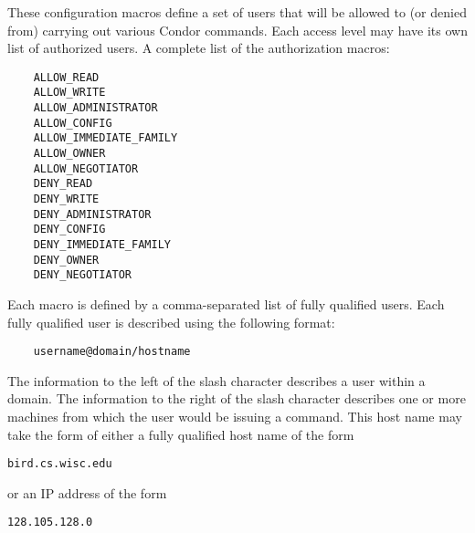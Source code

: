 These configuration macros define a set of users that will be
allowed to (or denied from) carrying out various Condor commands.
Each access level may have its own list of authorized users.
A complete list of the authorization macros:
\begin{verbatim}
    ALLOW_READ
    ALLOW_WRITE
    ALLOW_ADMINISTRATOR
    ALLOW_CONFIG
    ALLOW_IMMEDIATE_FAMILY
    ALLOW_OWNER
    ALLOW_NEGOTIATOR
    DENY_READ
    DENY_WRITE
    DENY_ADMINISTRATOR
    DENY_CONFIG
    DENY_IMMEDIATE_FAMILY
    DENY_OWNER
    DENY_NEGOTIATOR
\end{verbatim}

Each macro is defined by a comma-separated list of fully qualified
users.
Each
fully qualified user
is described using the following format:
\begin{verbatim}
    username@domain/hostname
\end{verbatim}
The information to the left of the slash character describes
a user within a domain.
The information to the right of the slash character describes
one or more machines from which the user would be issuing a command. 
This host name may take the form of either a fully qualified host name
of the form
\begin{verbatim}
bird.cs.wisc.edu
\end{verbatim}
or an IP address
of the form
\begin{verbatim}
128.105.128.0
\end{verbatim}

